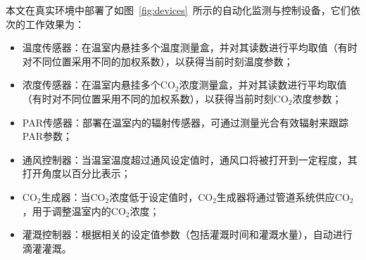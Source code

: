 
本文在真实环境中部署了如图~\ref{fig:devices}~所示的自动化监测与控制设备，它们依次的工作效果为：

\begin{itemize}
    \item 温度传感器：在温室内悬挂多个温度测量盒，并对其读数进行平均取值（有时对不同位置采用不同的加权系数），以获得当前时刻温度参数；
    \item 浓度传感器：在温室内悬挂多个CO$_2$浓度测量盒，并对其读数进行平均取值（有时对不同位置采用不同的加权系数），以获得当前时刻CO$_2$浓度参数；
    \item PAR传感器：部署在温室内的辐射传感器，可通过测量光合有效辐射来跟踪PAR参数；
    \item 通风控制器：当温室温度超过通风设定值时，通风口将被打开到一定程度，其打开角度以百分比表示；
    \item CO$_2$生成器：当CO$_2$浓度低于设定值时，CO$_2$生成器将通过管道系统供应CO$_2$，用于调整温室内的CO$_2$浓度；
    \item 灌溉控制器：根据相关的设定值参数（包括灌溉时间和灌溉水量），自动进行滴灌灌溉。
\end{itemize}

